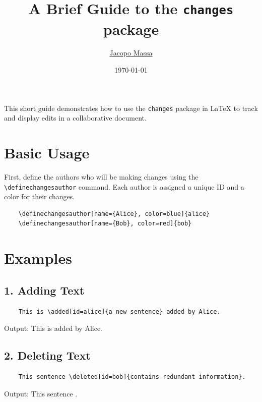 \documentclass{article}
\title{A Brief Guide to the \texttt{changes} package}
\author{\href{https://pages.di.unipi.it/massa}{Jacopo Massa}}
\date{\today}
\begin{document}
\maketitle

This short guide demonstrates how to use the \texttt{changes} package in \LaTeX{} to track and display edits in a collaborative document.

\section*{Basic Usage}

First, define the authors who will be making changes using the \verb|\definechangesauthor| command. Each author is assigned a unique ID and a color for their changes.

\begin{Verbatim}
	\definechangesauthor[name={Alice}, color=blue]{alice}
	\definechangesauthor[name={Bob}, color=red]{bob}
\end{Verbatim}

\section*{Examples}

\subsection*{1. Adding Text}

\begin{Verbatim}
	This is \added[id=alice]{a new sentence} added by Alice.
\end{Verbatim}

Output:
This is  added by Alice.

\vspace{1em}

\subsection*{2. Deleting Text}

\begin{Verbatim}
	This sentence \deleted[id=bob]{contains redundant information}.
\end{Verbatim}

Output:
This sentence .

\vspace{1em}
\end{document}
